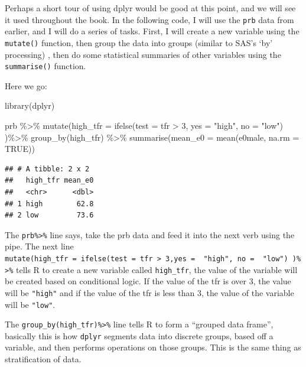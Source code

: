 \documentclass[
]{book}
\newenvironment{Shaded}{\begin{snugshade}}{\end{snugshade}}
\newcommand{\AttributeTok}[1]{\textcolor[rgb]{0.77,0.63,0.00}{#1}}
\newcommand{\ConstantTok}[1]{\textcolor[rgb]{0.00,0.00,0.00}{#1}}
\newcommand{\DecValTok}[1]{\textcolor[rgb]{0.00,0.00,0.81}{#1}}
\newcommand{\FunctionTok}[1]{\textcolor[rgb]{0.00,0.00,0.00}{#1}}
\newcommand{\NormalTok}[1]{#1}
\newcommand{\SpecialCharTok}[1]{\textcolor[rgb]{0.00,0.00,0.00}{#1}}
\newcommand{\StringTok}[1]{\textcolor[rgb]{0.31,0.60,0.02}{#1}}
\begin{document}
Perhaps a short tour of using dplyr would be good at this point, and we
will see it used throughout the book. In the following code, I will use
the \texttt{prb} data from earlier, and I will do a series of tasks. First, I
will create a new variable using the \texttt{mutate()} function, then group the
data into groups (similar to SAS's `by' processing) , then do some
statistical summaries of other variables using the \texttt{summarise()}
function.

Here we go:

\begin{Shaded}
\begin{Highlighting}[]
\FunctionTok{library}\NormalTok{(dplyr)}

\NormalTok{prb }\SpecialCharTok{\%\textgreater{}\%}
  \FunctionTok{mutate}\NormalTok{(}\AttributeTok{high\_tfr =} \FunctionTok{ifelse}\NormalTok{(}\AttributeTok{test =}\NormalTok{ tfr }\SpecialCharTok{\textgreater{}} \DecValTok{3}\NormalTok{,}
                           \AttributeTok{yes =}  \StringTok{"high"}\NormalTok{,}
                           \AttributeTok{no =}  \StringTok{"low"}\NormalTok{) )}\SpecialCharTok{\%\textgreater{}\%}
  \FunctionTok{group\_by}\NormalTok{(high\_tfr) }\SpecialCharTok{\%\textgreater{}\%}
  \FunctionTok{summarise}\NormalTok{(}\AttributeTok{mean\_e0 =} \FunctionTok{mean}\NormalTok{(e0male, }\AttributeTok{na.rm =} \ConstantTok{TRUE}\NormalTok{))}
\end{Highlighting}
\end{Shaded}

\begin{verbatim}
## # A tibble: 2 x 2
##   high_tfr mean_e0
##   <chr>      <dbl>
## 1 high        62.8
## 2 low         73.6
\end{verbatim}

The \texttt{prb\%\textgreater{}\%} line says, take the prb data and feed it into the next verb
using the pipe. The next line
\texttt{mutate(high\_tfr\ =\ ifelse(test\ =\ tfr\ \textgreater{}\ 3,yes\ =\ \ "high",\ no\ =\ \ "low")\ )\%\textgreater{}\%}
tells R to create a new variable called \texttt{high\_tfr}, the value of the
variable will be created based on conditional logic. If the value of the
tfr is over 3, the value will be \texttt{"high"} and if the value of the tfr is
less than 3, the value of the variable will be \texttt{"low"}.

The \texttt{group\_by(high\_tfr)\%\textgreater{}\%} line tells R to form a ``grouped data frame'',
basically this is how \texttt{dplyr} segments data into discrete groups, based
off a variable, and then performs operations on those groups. This is
the same thing as stratification of data.
\end{document}

